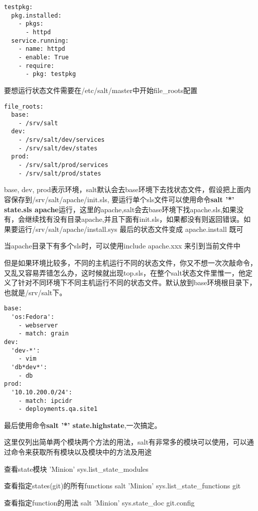 \begin{lstlisting}
testpkg:
  pkg.installed:
    - pkgs:
      - httpd
  service.running:
    - name: httpd
    - enable: True
    - require:
      - pkg: testpkg
\end{lstlisting}


要想运行状态文件需要在/etc/salt/master中开始file_roots配置
\begin{lstlisting}
file_roots:
  base:
    - /srv/salt
  dev:
    - /srv/salt/dev/services
    - /srv/salt/dev/states
  prod:
    - /srv/salt/prod/services
    - /srv/salt/prod/states
\end{lstlisting}

base, dev, prod表示环境，salt默认会去base环境下去找状态文件，假设把上面内容保存到/srv/salt/apache/init.sls, 要运行单个sls文件可以使用命令\textbf{salt '*' state.sls apache}运行，这里的apache,salt会去base环境下找apache.sls,如果没有，会继续找有没有目录apache,并且下面有init.sls，如果都没有则返回错误。如果要运行/srv/salt/apache/install.sys 最后的状态文件变成  apache.install 既可



当apache目录下有多个sls时，可以使用include apache.xxx 来引到当前文件中

但是如果环境比较多，不同的主机运行不同的状态文件，你又不想一次次敲命令，又乱又容易弄错怎么办，这时候就出现top.sls，在整个salt状态文件里惟一，他定义了针对不同环境下不同主机运行不同的状态文件。默认放到base环境根目录下，也就是/srv/salt下。
\begin{lstlisting}
base:
  'os:Fedora':
    - webserver
    - match: grain
dev:
  'dev-*':
    - vim
  'db*dev*':
    - db
prod:
  '10.10.200.0/24':
    - match: ipcidr
    - deployments.qa.site1
\end{lstlisting}

最后使用命令\textbf{salt '*' state.highstate},一次搞定。

这里仅列出简单两个模块两个方法的用法，salt有非常多的模块可以使用，可以通过命令来获取所有模块以及模块中的方法及用途

\begin{description}
\item{查看state模块} 'Minion' sys.list_state_modules
\item{查看指定states(git)的所有functions} salt 'Minion' sys.list_state_functions git 
\item{查看指定function的用法} salt 'Minion' sys.state_doc git.config
\end{description}



